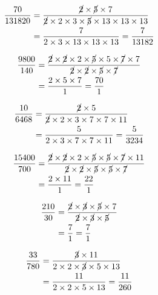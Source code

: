 {{\item\begin{align*}
    \dfrac{70}{131820} &=
    \dfrac{\cancel{2} \times \cancel{5} \times 7}
    {\cancel{2} \times 2 \times 3 \times \cancel{5} \times 13 \times 13 \times 13}\\ &=
    \dfrac{7}
    {2 \times 3 \times 13 \times 13 \times 13} =
    \dfrac{7}{13182}
    \end{align*}

\item\begin{align*}
    \dfrac{9800}{140} &=
    \dfrac{\cancel{2} \times \cancel{2} \times 2 \times \cancel{5} \times 5 \times \cancel{7} \times 7}
    {\cancel{2} \times \cancel{2} \times \cancel{5} \times \cancel{7}}\\ &=
    \dfrac{2 \times 5 \times 7}
    {1} =
    \dfrac{70}{1}
    \end{align*}

\item\begin{align*}
    \dfrac{10}{6468} &=
    \dfrac{\cancel{2} \times 5}
    {\cancel{2} \times 2 \times 3 \times 7 \times 7 \times 11}\\ &=
    \dfrac{5}
    {2 \times 3 \times 7 \times 7 \times 11} =
    \dfrac{5}{3234}
    \end{align*}

\item\begin{align*}
    \dfrac{15400}{700} &=
    \dfrac{\cancel{2} \times \cancel{2} \times 2 \times \cancel{5} \times \cancel{5} \times \cancel{7} \times 11}
    {\cancel{2} \times \cancel{2} \times \cancel{5} \times \cancel{5} \times \cancel{7}}\\ &=
    \dfrac{2 \times 11}
    {1} =
    \dfrac{22}{1}
    \end{align*}

\item\begin{align*}
    \dfrac{210}{30} &=
    \dfrac{\cancel{2} \times \cancel{3} \times \cancel{5} \times 7}
    {\cancel{2} \times \cancel{3} \times \cancel{5}}\\ &=
    \dfrac{7}
    {1} =
    \dfrac{7}{1}
    \end{align*}

\item\begin{align*}
    \dfrac{33}{780} &=
    \dfrac{\cancel{3} \times 11}
    {2 \times 2 \times \cancel{3} \times 5 \times 13}\\ &=
    \dfrac{11}
    {2 \times 2 \times 5 \times 13} =
    \dfrac{11}{260}
    \end{align*}

}}
